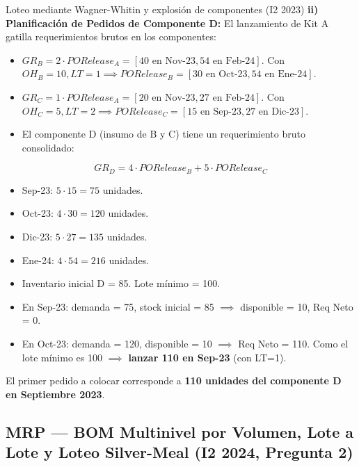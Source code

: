 \begin{ejercicio}{Loteo mediante Wagner-Whitin y explosión de componentes (I2 2023)}
\textbf{ii) Planificación de Pedidos de Componente D:}
El lanzamiento de Kit A gatilla requerimientos brutos en los componentes:
\begin{itemize}
  \item $GR_B = 2 \cdot PORelease_A = [40 \text{ en Nov-23}, 54 \text{ en Feb-24}]$. Con $OH_B=10, LT=1 \implies PORelease_B = [30 \text{ en Oct-23}, 54 \text{ en Ene-24}]$.
  \item $GR_C = 1 \cdot PORelease_A = [20 \text{ en Nov-23}, 27 \text{ en Feb-24}]$. Con $OH_C=5, LT=2 \implies PORelease_C = [15 \text{ en Sep-23}, 27 \text{ en Dic-23}]$.
  \item El componente D (insumo de B y C) tiene un requerimiento bruto consolidado:
\end{itemize}
  $$GR_D = 4 \cdot PORelease_B + 5 \cdot PORelease_C$$
\begin{itemize}
  \item Sep-23: $5 \cdot 15 = 75$ unidades.
  \item Oct-23: $4 \cdot 30 = 120$ unidades.
  \item Dic-23: $5 \cdot 27 = 135$ unidades.
  \item Ene-24: $4 \cdot 54 = 216$ unidades.
  \item Inventario inicial D = 85. Lote mínimo = 100.
  \item En Sep-23: demanda = 75, stock inicial = 85 $\implies$ disponible = 10, Req Neto = 0.
  \item En Oct-23: demanda = 120, disponible = 10 $\implies$ Req Neto = 110. Como el lote mínimo es 100 $\implies$ \textbf{lanzar 110 en Sep-23} (con LT=1).
\end{itemize}

El primer pedido a colocar corresponde a \textbf{110 unidades del componente D en Septiembre 2023}.
\end{ejercicio}


\subsection[MRP: BOM Multinivel (I2 2024)]{MRP --- BOM Multinivel por Volumen, Lote a Lote y Loteo Silver-Meal (I2 2024, Pregunta 2)}

